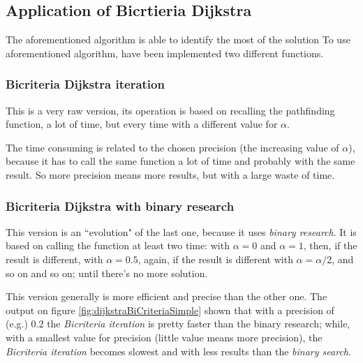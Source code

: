 \documentclass[a4paper,11pt]{report}
\begin{document}
\subsection{Application of Bicrtieria Dijkstra}
The aforementioned algorithm is able to identify the most of the solution 
To use aforementioned algorithm, have been implemented two different functions.

\subsubsection{Bicriteria Dijkstra iteration}
This is a very raw version, its operation is based on recalling the pathfinding function, a lot of time, but every time with a different value for $\alpha$.

The time consuming is related to the chosen precision (the increasing value of $\alpha$), because it has to call the same function a lot of time and probably with the same result. So more precision means more results, but with a large waste of time.

\subsubsection{Bicriteria Dijkstra with binary research}
This version is an ``evolution" of the last one, because it uses \textit{binary research}. It is based on calling the function at least two time: with $\alpha = 0$ and $\alpha=1$, then, if the result is different, with $\alpha=0.5$, again, if the result is different with $\alpha=\alpha/2$, and so on and so on; until there's no more solution.

This version generally is more efficient and precise than the other one. The output on figure \ref{fig:dijkstraBiCriteriaSimple} shown that with a precision of (e.g.) $0.2$ the \textit{Bicriteria iteration} is pretty faster than the binary research; while, with a smallest value for precision (little value means more precision), the \textit{Bicriteria iteration} becomes slowest and with less results than the \textit{binary search}.
\end{document}
